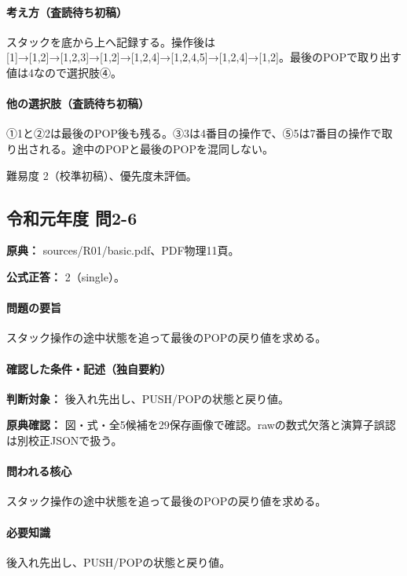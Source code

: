 \paragraph{考え方（査読待ち初稿）} スタックを底から上へ記録する。操作後は [1]→[1,2]→[1,2,3]→[1,2]→[1,2,4]→[1,2,4,5]→[1,2,4]→[1,2]。最後のPOPで取り出す値は4なので選択肢④。

\paragraph{他の選択肢（査読待ち初稿）} ①1と②2は最後のPOP後も残る。③3は4番目の操作で、⑤5は7番目の操作で取り出される。途中のPOPと最後のPOPを混同しない。

\par 難易度 2（校準初稿）、優先度未評価。

\subsection{令和元年度 問2-6}
\label{q:r01-reg-basic-2-6}

\noindent\textbf{原典：} sources/R01/basic.pdf、PDF物理11頁。

\textbf{公式正答：} 2（single）。

\paragraph{問題の要旨} スタック操作の途中状態を追って最後のPOPの戻り値を求める。

\paragraph{確認した条件・記述（独自要約）}\mbox{}\par

\noindent\textbf{判断対象：} 後入れ先出し、PUSH/POPの状態と戻り値。\par

\noindent\textbf{原典確認：} 図・式・全5候補を29保存画像で確認。rawの数式欠落と演算子誤認は別校正JSONで扱う。\par

\paragraph{問われる核心} スタック操作の途中状態を追って最後のPOPの戻り値を求める。

\paragraph{必要知識} 後入れ先出し、PUSH/POPの状態と戻り値。

